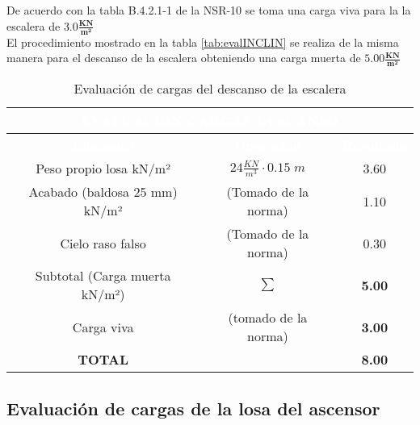 \documentclass[12pt]{article}
\begin{document}
De acuerdo con la tabla B.4.2.1-1 de la NSR-10 se toma una carga viva para la la escalera de  $\mathbf{3.0 \tfrac{KN}{m^2}}$ \\

El procedimiento mostrado en la tabla \ref{tab:evalINCLIN} se realiza de la misma manera para el descanso de la escalera obteniendo una carga muerta de $\mathbf{5.00\tfrac{KN}{m^2}}$ 

\begin{table}[H]
\centering

\begin{tabular}{|c|c|c|} 
\hline
\multicolumn{3}{|c|}{{\cellcolor[rgb]{ .2,  .247,  .31}}\textcolor{white}{\textbf{EVALUACIÓN CARGAS DESCANSO}}}                                        \\ 
\hline
\rowcolor[rgb]{ .2,  .247,  .31} \textcolor{white}{\textbf{Elemento}} & \textcolor{white}{\textbf{Operación}} & \textcolor{white}{\textbf{Resultado}}  \\ 
\hline
{\cellcolor[rgb]{1,1,1}}Peso propio losa
  kN/m²        & $24\tfrac{KN}{m^3} \cdot 0.15\;m$                                     & 3.60                                   \\ 
\hline
{\cellcolor[rgb]{1,1,1}}Acabado (baldosa 25
  mm) kN/m² & (Tomado de la norma)                                     & 1.10                                   \\ 
\hline
{\cellcolor[rgb]{1,1,1}}Cielo raso falso                    & (Tomado de la norma)                                       & 0.30                                   \\ 
\hline
{\cellcolor[rgb]{1,1,1}}Subtotal (Carga
  muerta kN/m²) & $\mathbf{\sum}$                                     & \textbf{5.00 }                                  \\ 
\hline
{\cellcolor[rgb]{1,1,1}}Carga viva                      & (tomado de la norma)                                     & \textbf{3.00  }                                 \\ 
\hline
{\cellcolor[rgb]{1,1,1}}\textbf{TOTAL}                  & ~                                     & \textbf{8.00   }                                \\
\hline
\end{tabular}
\caption{Evaluación de cargas del descanso de la escalera }
\label{tab:Evaldescanso}
\end{table}




\subsection{Evaluación de cargas de la losa del ascensor}
\end{document}
